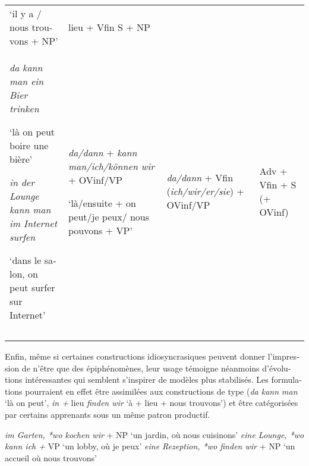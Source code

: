 \documentclass[output=paper]{langscibook}
\begin{document}
\begin{otherlanguage}{french}
\begin{sidewaystable}
\begin{tabularx}{\textwidth}{QQQl}
    `il y a / nous trouvons + NP' & lieu + Vfin S + NP & \\\addlinespace
    \textit{da kann man ein Bier trinken}
    
    `là on peut boire une bière'
    
    \textit{in der Lounge kann man im Internet surfen }
    
    `dans le salon, on peut surfer sur Internet' & \textit{da\slash dann} + \textit{kann man\slash ich\slash können wir} + OVinf\slash VP
    
    `là/ensuite + on peut/je peux/ nous pouvons + VP' & \textit{da\slash dann} + Vfin (\textit{ich\slash wir\slash er\slash sie}) + OVinf/VP & \parbox{1.75cm}{Adv + Vfin + S (+ OVinf)} \\\addlinespace
     & & & \\
    \lspbottomrule
\end{tabularx}
\end{sidewaystable}

\begin{sloppypar}
Enfin, même si certaines constructions idiosyncrasiques peuvent donner l’impression de n’être que des épiphénomènes, leur usage témoigne néanmoins d’évolutions intéressantes qui semblent s’inspirer de modèles plus stabilisés. Les formulations  pourraient en effet être assimilées aux constructions de type (\textit{da kann man} `là on peut', \textit{in +} lieu \textit{finden wir} `à + lieu + nous trouvons') et être catégorisées par certains apprenants sous un même patron productif.
\end{sloppypar}

\ea%
    \label{ex:felce:18}
     \ea \textit{im Garten, *wo kochen wir} + NP `un jardin, où nous cuisinons'
     \ex \textit{eine Lounge, *wo kann ich +} VP `un lobby, où je peux'
     \ex \textit{eine Rezeption, *wo finden wir} + NP `un accueil où nous trouvons'
     \z
\z


\end{otherlanguage}
\end{document}
